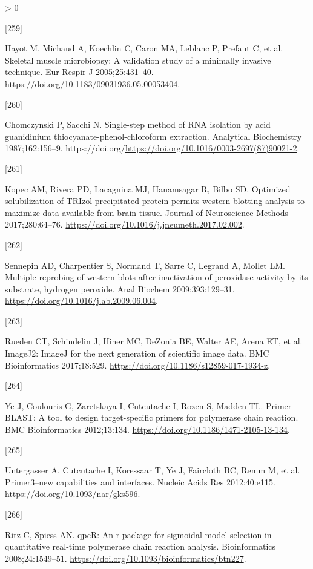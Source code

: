 \documentclass[twoside,10pt]{gihclass} %
\newlength{\cslhangindent}
\newlength{\csllabelwidth}
\newenvironment{CSLReferences}[3] %
 {%
  \setlength{\parindent}{0pt}
  \ifodd #1 \everypar{\setlength{\hangindent}{\cslhangindent}}\ignorespaces\fi
  \ifnum #2 > 0
  \setlength{\parskip}{#2\baselineskip}
  \fi
 }%
 {}
\newcommand{\CSLLeftMargin}[1]{\parbox[t]{\maxof{\widthof{#1}}{\csllabelwidth}}{#1}}
\newcommand{\CSLRightInline}[1]{\parbox[t]{\linewidth}{#1}}
\begin{document}
\begin{CSLReferences}{0}{0}
\leavevmode\hypertarget{ref-RN824}{}%
\CSLLeftMargin{{[}259{]} }
\CSLRightInline{Hayot M, Michaud A, Koechlin C, Caron MA, Leblanc P, Prefaut C, et al. Skeletal muscle microbiopsy: A validation study of a minimally invasive technique. Eur Respir J 2005;25:431--40. \url{https://doi.org/10.1183/09031936.05.00053404}.}

\leavevmode\hypertarget{ref-RN2672}{}%
\CSLLeftMargin{{[}260{]} }
\CSLRightInline{Chomczynski P, Sacchi N. Single-step method of RNA isolation by acid guanidinium thiocyanate-phenol-chloroform extraction. Analytical Biochemistry 1987;162:156--9. https://doi.org/\url{https://doi.org/10.1016/0003-2697(87)90021-2}.}

\leavevmode\hypertarget{ref-RN2050}{}%
\CSLLeftMargin{{[}261{]} }
\CSLRightInline{Kopec AM, Rivera PD, Lacagnina MJ, Hanamsagar R, Bilbo SD. Optimized solubilization of TRIzol-precipitated protein permits western blotting analysis to maximize data available from brain tissue. Journal of Neuroscience Methods 2017;280:64--76. \url{https://doi.org/10.1016/j.jneumeth.2017.02.002}.}

\leavevmode\hypertarget{ref-RN1930}{}%
\CSLLeftMargin{{[}262{]} }
\CSLRightInline{Sennepin AD, Charpentier S, Normand T, Sarre C, Legrand A, Mollet LM. Multiple reprobing of western blots after inactivation of peroxidase activity by its substrate, hydrogen peroxide. Anal Biochem 2009;393:129--31. \url{https://doi.org/10.1016/j.ab.2009.06.004}.}

\leavevmode\hypertarget{ref-RN2259}{}%
\CSLLeftMargin{{[}263{]} }
\CSLRightInline{Rueden CT, Schindelin J, Hiner MC, DeZonia BE, Walter AE, Arena ET, et al. ImageJ2: ImageJ for the next generation of scientific image data. BMC Bioinformatics 2017;18:529. \url{https://doi.org/10.1186/s12859-017-1934-z}.}

\leavevmode\hypertarget{ref-RN1815}{}%
\CSLLeftMargin{{[}264{]} }
\CSLRightInline{Ye J, Coulouris G, Zaretskaya I, Cutcutache I, Rozen S, Madden TL. Primer-BLAST: A tool to design target-specific primers for polymerase chain reaction. BMC Bioinformatics 2012;13:134. \url{https://doi.org/10.1186/1471-2105-13-134}.}

\leavevmode\hypertarget{ref-RN1816}{}%
\CSLLeftMargin{{[}265{]} }
\CSLRightInline{Untergasser A, Cutcutache I, Koressaar T, Ye J, Faircloth BC, Remm M, et al. Primer3--new capabilities and interfaces. Nucleic Acids Res 2012;40:e115. \url{https://doi.org/10.1093/nar/gks596}.}

\leavevmode\hypertarget{ref-RN1768}{}%
\CSLLeftMargin{{[}266{]} }
\CSLRightInline{Ritz C, Spiess AN. qpcR: An r package for sigmoidal model selection in quantitative real-time polymerase chain reaction analysis. Bioinformatics 2008;24:1549--51. \url{https://doi.org/10.1093/bioinformatics/btn227}.}


\end{CSLReferences}
\end{document}
